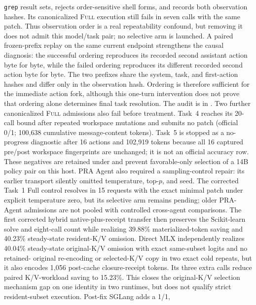 \documentclass[11pt]{article}
\begin{document}
\texttt{grep} result sets, rejects order-sensitive shell forms, and records
both observation hashes.  Its canonicalized \textsc{Full} execution still
fails in seven calls with the same patch.  Thus observation order is a real
repeatability confound, but removing it does not admit this model/task pair;
no selective arm is launched.  A paired frozen-prefix replay on the same
current endpoint strengthens the causal diagnosis: the successful ordering
reproduces its recorded second assistant action byte for byte, while the failed
ordering reproduces its different recorded second action byte for byte.  The
two prefixes share the system, task, and first-action hashes and differ only in
the observation hash.  Ordering is therefore sufficient for the immediate
action fork, although this one-turn intervention does not prove that ordering
alone determines final task resolution.  The audit is in
.
Two further canonicalized \textsc{Full} admissions also fail before treatment.
Task~4 reaches its 20-call bound after repeated workspace mutations and submits
no patch (official 0/1; 100,638 cumulative message-content tokens).  Task~5 is
stopped as a no-progress diagnostic after 16 actions and 102,919 tokens because
all 16 captured pre/post workspace fingerprints are unchanged; it is not an
official accuracy row.  These negatives are retained under
 and
prevent favorable-only selection of a 14B policy pair on this host.
PRA Agent also required a sampling-control repair: its earlier transport
silently omitted temperature, top-$p$, and seed.  The corrected Task~1 Full
control resolves in 15 requests with the exact minimal patch under explicit
temperature zero, but its selective arm remains pending; older PRA-Agent
admissions are not pooled with controlled cross-agent comparisons.
The first corrected hybrid native-plus-receipt transfer then preserves the Scikit-learn solve and
eight-call count while realizing 39.88\% materialized-token saving and 40.23\%
steady-state resident-K/V omission.  Direct MLX independently realizes 40.04\%
steady-state original-K/V omission with exact same-subset logits and no retained-
original re-encoding or selected-K/V copy in two exact cold repeats, but it also
encodes 1,056 post-cache closure-receipt tokens.  Its three extra calls reduce
paired K/V-workload saving to 15.23\%.  This closes the
original-K/V selection mechanism gap on one identity in two runtimes, but does
not qualify strict resident-subset execution.  Post-fix SGLang adds a 1/1,
\end{document}
